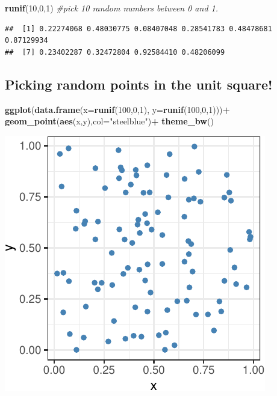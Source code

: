 \documentclass[
]{book}
\newenvironment{Shaded}{\begin{snugshade}}{\end{snugshade}}
\newcommand{\AttributeTok}[1]{\textcolor[rgb]{0.13,0.29,0.53}{#1}}
\newcommand{\CommentTok}[1]{\textcolor[rgb]{0.56,0.35,0.01}{\textit{#1}}}
\newcommand{\DecValTok}[1]{\textcolor[rgb]{0.00,0.00,0.81}{#1}}
\newcommand{\FunctionTok}[1]{\textcolor[rgb]{0.13,0.29,0.53}{\textbf{#1}}}
\newcommand{\NormalTok}[1]{#1}
\newcommand{\SpecialCharTok}[1]{\textcolor[rgb]{0.81,0.36,0.00}{\textbf{#1}}}
\newcommand{\StringTok}[1]{\textcolor[rgb]{0.31,0.60,0.02}{#1}}
\theoremstyle{definition}
\theoremstyle{definition}
\theoremstyle{definition}
\theoremstyle{definition}
\theoremstyle{remark}
\begin{document}
\begin{Shaded}
\begin{Highlighting}[]
\FunctionTok{runif}\NormalTok{(}\DecValTok{10}\NormalTok{,}\DecValTok{0}\NormalTok{,}\DecValTok{1}\NormalTok{) }\CommentTok{\#pick 10 random numbers between 0 and 1.}
\end{Highlighting}
\end{Shaded}

\begin{verbatim}
##  [1] 0.22274068 0.48030775 0.08407048 0.28541783 0.48478681 0.87129934
##  [7] 0.23402287 0.32472804 0.92584410 0.48206099
\end{verbatim}

\subsection{Picking random points in the unit square!}\label{picking-random-points-in-the-unit-square}

\begin{Shaded}
\begin{Highlighting}[]
\FunctionTok{ggplot}\NormalTok{(}\FunctionTok{data.frame}\NormalTok{(}\AttributeTok{x=}\FunctionTok{runif}\NormalTok{(}\DecValTok{100}\NormalTok{,}\DecValTok{0}\NormalTok{,}\DecValTok{1}\NormalTok{),}
                 \AttributeTok{y=}\FunctionTok{runif}\NormalTok{(}\DecValTok{100}\NormalTok{,}\DecValTok{0}\NormalTok{,}\DecValTok{1}\NormalTok{)))}\SpecialCharTok{+}
  \FunctionTok{geom\_point}\NormalTok{(}\FunctionTok{aes}\NormalTok{(x,y),}\AttributeTok{col=}\StringTok{"steelblue"}\NormalTok{)}\SpecialCharTok{+}
  \FunctionTok{theme\_bw}\NormalTok{()}
\end{Highlighting}
\end{Shaded}

\includegraphics{math340-notes_files/figure-latex/unnamed-chunk-172-1.pdf}
\end{document}
